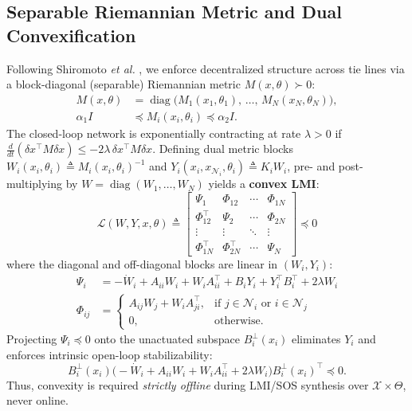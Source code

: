 \documentclass[journal]{IEEEtran}
\begin{document}
\subsection{Separable Riemannian Metric and Dual Convexification}
Following Shiromoto \textit{et al.} \cite{shiromoto18}, we enforce decentralized structure across tie lines via a block-diagonal (separable) Riemannian metric $M(x, \theta) \succ 0$:
\begin{align}
M(x, \theta) &= \operatorname{diag}\big(M_1(x_1, \theta_1),\, \dots,\, M_N(x_N, \theta_N)\big), \\
\alpha_1 I &\preceq M_i(x_i, \theta_i) \preceq \alpha_2 I.
\end{align}
The closed-loop network is exponentially contracting at rate $\lambda > 0$ if $\frac{d}{dt}(\delta x^\top M \delta x) \le -2\lambda\, \delta x^\top M \delta x$. Defining dual metric blocks $W_i(x_i, \theta_i) \triangleq M_i(x_i, \theta_i)^{-1}$ and $Y_i(x_i, x_{\mathcal{N}_i}, \theta_i) \triangleq K_i W_i$, pre- and post-multiplying by $W = \operatorname{diag}(W_1, \dots, W_N)$ yields a \textbf{convex LMI}:
\begin{equation}
\mathcal{L}(W, Y, x, \theta) \triangleq
\begin{bmatrix}
\Psi_1 & \Phi_{12} & \cdots & \Phi_{1N} \\
\Phi_{12}^\top & \Psi_2 & \cdots & \Phi_{2N} \\
\vdots & \vdots & \ddots & \vdots \\
\Phi_{1N}^\top & \Phi_{2N}^\top & \cdots & \Psi_N
\end{bmatrix} \preceq 0
\end{equation}
where the diagonal and off-diagonal blocks are linear in $(W_i, Y_i)$:
\begin{align}
\Psi_i &= -\dot{W}_i + A_{ii} W_i + W_i A_{ii}^\top + B_i Y_i + Y_i^\top B_i^\top + 2\lambda W_i \\
\Phi_{ij} &=
\begin{cases}
A_{ij} W_j + W_i A_{ji}^\top, & \text{if } j \in \mathcal{N}_i \text{ or } i \in \mathcal{N}_j \\
0, & \text{otherwise.}
\end{cases}
\end{align}
Projecting $\Psi_i \preceq 0$ onto the unactuated subspace $B_i^\perp(x_i)$ eliminates $Y_i$ and enforces intrinsic open-loop stabilizability:
\begin{equation}
B_i^\perp(x_i)\Big(-\dot{W}_i + A_{ii} W_i + W_i A_{ii}^\top + 2\lambda W_i\Big)B_i^\perp(x_i)^\top \preceq 0.
\end{equation}
Thus, convexity is required \emph{strictly offline} during LMI/SOS synthesis over $\mathcal{X} \times \Theta$, never online.
\end{document}
